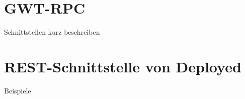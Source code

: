 \section{GWT-RPC}

Schnittstellen kurz beschreiben

\section{REST-Schnittstelle von Deployed}

Beispiele